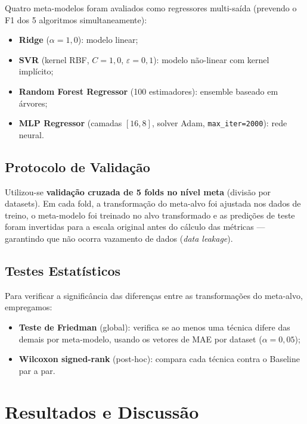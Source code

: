 \documentclass[12pt]{article}
\begin{document}
Quatro meta-modelos foram avaliados como regressores multi-saída (prevendo o F1 dos 5 algoritmos simultaneamente):
\begin{itemize}
  \item \textbf{Ridge} ($\alpha = 1{,}0$): modelo linear;
  \item \textbf{SVR} (kernel RBF, $C=1{,}0$, $\varepsilon=0{,}1$): modelo não-linear com kernel implícito;
  \item \textbf{Random Forest Regressor} (100 estimadores): ensemble baseado em árvores;
  \item \textbf{MLP Regressor} (camadas $[16, 8]$, solver Adam, \texttt{max\_iter=2000}): rede neural.
\end{itemize}

\subsection{Protocolo de Validação}

Utilizou-se \textbf{validação cruzada de 5 folds no nível meta} (divisão por datasets). Em cada fold, a transformação do meta-alvo foi ajustada nos dados de treino, o meta-modelo foi treinado no alvo transformado e as predições de teste foram invertidas para a escala original antes do cálculo das métricas --- garantindo que não ocorra vazamento de dados (\textit{data leakage}).

\subsection{Testes Estatísticos}

Para verificar a significância das diferenças entre as transformações do meta-alvo, empregamos:
\begin{itemize}
  \item \textbf{Teste de Friedman} (global): verifica se ao menos uma técnica difere das demais por meta-modelo, usando os vetores de MAE por dataset ($\alpha = 0{,}05$);
  \item \textbf{Wilcoxon signed-rank} (post-hoc): compara cada técnica contra o Baseline par a par.
\end{itemize}

\section{Resultados e Discussão}
\end{document}
